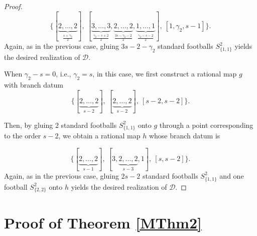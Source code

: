 \documentclass[microtype]{gtpart}     %
\theoremstyle{definition}
\begin{document}
\begin{proof}
\[
\bigl\{[\underbrace{2,\ldots,2}_{\frac{s+\gamma_{2}}{2}}],\ [\underbrace{3,\ldots,3}_{\frac{\gamma_{2}-s+2}{2}},\underbrace{2,\ldots,2}_{\frac{3s-\gamma_{2}-2}{2}},\underbrace{1,\ldots,1}_{\frac{\gamma_{2}-s-2}{2}}],\ [1,\gamma_{2},s-1]\bigr\}.
\]
Again, as in the previous case, gluing $3s-2-\gamma_{2}$ standard footballs \(S^2_{\{1,1\}}\) yields the desired realization of \(\mathcal D\).

When  \(\gamma_{2}-s=0\), i.e., $\gamma_{2}=s$, in this case, we first construct a rational map \(g\) with branch datum
\[
\bigl\{[\underbrace{2,\ldots,2}_{s-2}],\ [\underbrace{2,\ldots,2}_{s-2}],\ [s-2,s-2]\bigr\}.
\]

Then, by gluing \(2\) standard footballs \(S^2_{\{1,1\}}\) onto \(g\) through a point corresponding to the order \(s-2\), we obtain a rational map \(h\) whose branch datum is

\[
\bigl\{[\underbrace{2,\ldots,2}_{s-1}],\ [3,\underbrace{2,\ldots,2}_{s-3},1],\ [s,s-2]\bigr\}.
\]
Again, as in the previous case, gluing $2s-2$ standard footballs \(S^2_{\{1,1\}}\) and one football $S^{2}_{\{2,2\}}$ onto \(h\) yields the desired realization of \(\mathcal D\).
\end{proof}

\section{Proof of Theorem \ref{MThm2}}\label{sec4}
\end{document}
